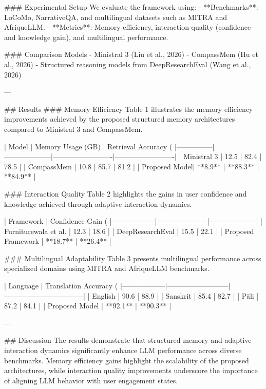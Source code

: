 ### Experimental Setup
We evaluate the framework using:
- **Benchmarks**: LoCoMo, NarrativeQA, and multilingual datasets such as MITRA and AfriqueLLM.
- **Metrics**: Memory efficiency, interaction quality (confidence and knowledge gain), and multilingual performance.

### Comparison Models
- Ministral 3 (Liu et al., 2026)
- CompassMem (Hu et al., 2026)
- Structured reasoning models from DeepResearchEval (Wang et al., 2026)

---

## Results
### Memory Efficiency
Table 1 illustrates the memory efficiency improvements achieved by the proposed structured memory architectures compared to Ministral 3 and CompassMem.

| Model         | Memory Usage (GB) | Retrieval Accuracy (%
|---------------|--------------------|-------------------------|-------------------------|
| Ministral 3   | 12.5              | 82.4                   | 78.5                   |
| CompassMem    | 10.8              | 85.7                   | 81.2                   |
| Proposed Model| **8.9**           | **88.3**               | **84.9**               |

### Interaction Quality
Table 2 highlights the gains in user confidence and knowledge achieved through adaptive interaction dynamics.

| Framework        | Confidence Gain (%
|------------------|---------------------|--------------------|
| Furniturewala et al. | 12.3                | 18.6              |
| DeepResearchEval     | 15.5                | 22.1              |
| Proposed Framework   | **18.7**           | **26.4**          |

### Multilingual Adaptability
Table 3 presents multilingual performance across specialized domains using MITRA and AfriqueLLM benchmarks.

| Language         | Translation Accuracy (%
|------------------|--------------------------|---------------------------------|
| English          | 90.6                     | 88.9                           |
| Sanskrit         | 85.4                     | 82.7                           |
| Pāli             | 87.2                     | 84.1                           |
| Proposed Model   | **92.1**                 | **90.3**                       |

---

## Discussion
The results demonstrate that structured memory and adaptive interaction dynamics significantly enhance LLM performance across diverse benchmarks. Memory efficiency gains highlight the scalability of the proposed architectures, while interaction quality improvements underscore the importance of aligning LLM behavior with user engagement states.

